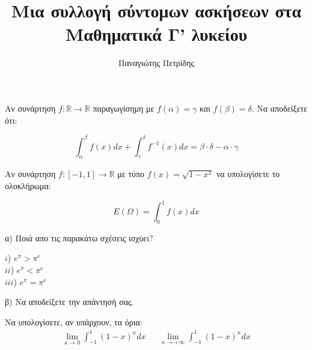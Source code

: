 \documentclass{exam}
\title{\textgreek{Μια συλλογή σύντομων ασκήσεων στα \\ Μαθηματικά Γ' λυκείου}}
\date{}
\author{\textgreek{Παναγιώτης Πετρίδης}}
\begin{document}
    \maketitle
    \thispagestyle{empty}
    \begin{questions}
        \newpage
        \setcounter{page}{1}
        \setcounter{equation}{0}
        
        \question \textgreek{Αν συνάρτηση $f:\mathbb{R}\rightarrow\mathbb{R}$ 
        παραγωγίσημη με $f(\alpha) = \gamma$ και $f(\beta) = \delta$. Να αποδείξετε ότι: }

        \begin{equation*}
            \int_{\alpha}^{\beta}f(x)dx + \int_{\gamma}^{\delta}f^{-1}(x)dx = \beta\cdot\delta - \alpha\cdot\gamma
        \end{equation*}

        \setcounter{equation}{0}
        \vspace{0.5cm}

        \question \textgreek{Αν συνάρτηση $f:[-1,1]\rightarrow\mathbb{R}$ 
        με τύπο $f(x) = \sqrt{1 - x^2}$ να υπολογίσετε το ολοκλήρωμα: }

        \begin{equation*}
            E(\Omega) = \int_{0}^{1}f(x)dx
        \end{equation*}

        \setcounter{equation}{0}
        \vspace{0.5cm}
        
        \question \textgreek{α) Ποιά απο τις παρακάτω σχέσεις ισχύει?}

        \begin{multicols}{4}
            $i$) $e^\pi > \pi^e$
            \\
            $ii$) $e^\pi < \pi^e$
            \\
            $iii$) $e^\pi = \pi^e$
        \end{multicols}

        \textgreek{β) Να αποδείξετε την απάντησή σας.}

        \setcounter{equation}{0}
        \vspace{0.5cm}
        
        \question \textgreek{Να υπολογίσετε, αν υπάρχουν, τα όρια: }
        \begin{align*}
            \lim_{\kappa\to0}\int_{-1}^{1}(1-x)^\kappa dx   &&   \lim_{\kappa\to+\infty}\int_{-1}^{1}(1-x)^\kappa dx
        \end{align*}


\end{questions}
\end{document}
